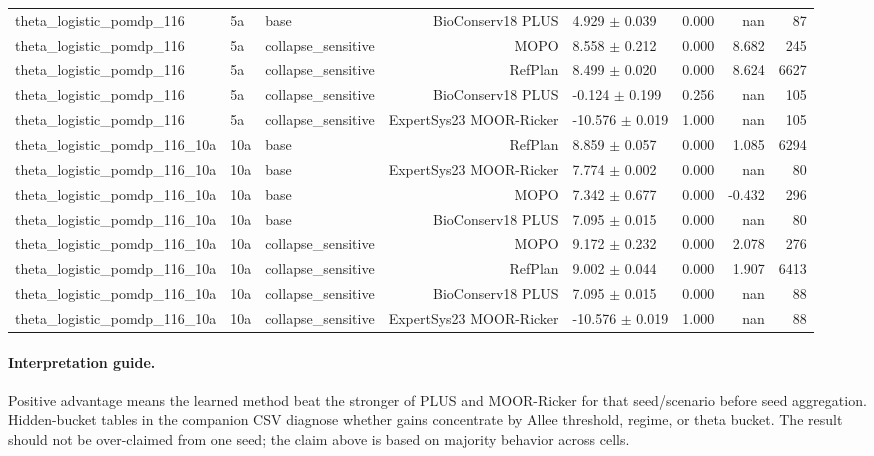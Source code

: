 \documentclass{article}
\begin{document}
\begin{longtable}{lllrlrrr}
theta\_logistic\_pomdp\_116 & 5a & base & BioConserv18 PLUS & 4.929 $\pm$ 0.039 & 0.000 & nan & 87 \\
theta\_logistic\_pomdp\_116 & 5a & collapse\_sensitive & MOPO & 8.558 $\pm$ 0.212 & 0.000 & 8.682 & 245 \\
theta\_logistic\_pomdp\_116 & 5a & collapse\_sensitive & RefPlan & 8.499 $\pm$ 0.020 & 0.000 & 8.624 & 6627 \\
theta\_logistic\_pomdp\_116 & 5a & collapse\_sensitive & BioConserv18 PLUS & -0.124 $\pm$ 0.199 & 0.256 & nan & 105 \\
theta\_logistic\_pomdp\_116 & 5a & collapse\_sensitive & ExpertSys23 MOOR-Ricker & -10.576 $\pm$ 0.019 & 1.000 & nan & 105 \\
theta\_logistic\_pomdp\_116\_10a & 10a & base & RefPlan & 8.859 $\pm$ 0.057 & 0.000 & 1.085 & 6294 \\
theta\_logistic\_pomdp\_116\_10a & 10a & base & ExpertSys23 MOOR-Ricker & 7.774 $\pm$ 0.002 & 0.000 & nan & 80 \\
theta\_logistic\_pomdp\_116\_10a & 10a & base & MOPO & 7.342 $\pm$ 0.677 & 0.000 & -0.432 & 296 \\
theta\_logistic\_pomdp\_116\_10a & 10a & base & BioConserv18 PLUS & 7.095 $\pm$ 0.015 & 0.000 & nan & 80 \\
theta\_logistic\_pomdp\_116\_10a & 10a & collapse\_sensitive & MOPO & 9.172 $\pm$ 0.232 & 0.000 & 2.078 & 276 \\
theta\_logistic\_pomdp\_116\_10a & 10a & collapse\_sensitive & RefPlan & 9.002 $\pm$ 0.044 & 0.000 & 1.907 & 6413 \\
theta\_logistic\_pomdp\_116\_10a & 10a & collapse\_sensitive & BioConserv18 PLUS & 7.095 $\pm$ 0.015 & 0.000 & nan & 88 \\
theta\_logistic\_pomdp\_116\_10a & 10a & collapse\_sensitive & ExpertSys23 MOOR-Ricker & -10.576 $\pm$ 0.019 & 1.000 & nan & 88 \\
\bottomrule
\end{longtable}

\paragraph{Interpretation guide.}
Positive advantage means the learned method beat the stronger of PLUS and
MOOR-Ricker for that seed/scenario before seed aggregation. Hidden-bucket
tables in the companion CSV diagnose whether gains concentrate by Allee
threshold, regime, or theta bucket. The result should not be over-claimed from
one seed; the claim above is based on majority behavior across cells.
\end{document}
